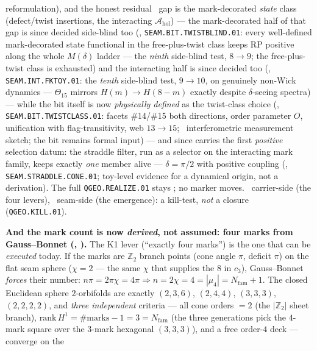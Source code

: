 \documentclass[11pt,a4paper]{article}
\newcommand{\Z}{\mathbb Z}
\begin{document}
\begin{keybox}
reformulation), and the honest residual \mO\ gap is the mark-decorated \emph{state} class
(defect/twist insertions, the interacting $\mathcal A_{\mathrm{hol}}$) --- the mark-decorated
half of that gap is since decided side-blind too
(, \texttt{SEAM.BIT.TWISTBLIND.01}: every well-defined
mark-decorated state functional in the free-plus-twist class keeps RP positive along the whole
$M(\delta)$ ladder --- the \emph{ninth} side-blind test, $8\to9$; the free-plus-twist class is
exhausted) and the interacting half is since decided too
(, \texttt{SEAM.INT.FKTOY.01}: the \emph{tenth}
side-blind test, $9\to10$, on genuinely non-Wick dynamics --- $\Theta_{15}$ mirrors
$H(m)\to H(8-m)$ exactly despite $\delta$-seeing spectra) --- while the bit itself is now
\emph{physically defined} as the twist-class choice
(, \texttt{SEAM.BIT.TWISTCLASS.01}: facets
\#14/\#15 both directions, order parameter $O$, unification with flag-transitivity, web
$13\to15$; \mC\ interferometric measurement sketch; the bit remains formal input) --- and since
carries the first \emph{positive} selection datum: the straddle filter, run as a selector on the
interacting mark family, keeps exactly \emph{one} member alive --- $\delta=\pi/2$ with positive
coupling (, \texttt{SEAM.STRADDLE.CONE.01}; toy-level
evidence for a dynamical origin, not a derivation).
The full \texttt{QGEO.REALIZE.01} stays \mO;
no marker moves. \mE\ carrier-side (the four
levers), \mO\ seam-side (the emergence): a kill-test, \emph{not} a closure (\texttt{QGEO.KILL.01}).
\par\smallskip\noindent\textbf{And the mark count is now \emph{derived}, not assumed: four marks from
Gauss--Bonnet (, ).} The K1 lever
(``exactly four marks'') is the one that can be \emph{executed} today. If the marks are $\Z_2$ branch points
(cone angle $\pi$, deficit $\pi$) on the flat seam sphere ($\chi{=}2$ --- the same $\chi$ that supplies the
$8$ in $c_3$), Gauss--Bonnet \emph{forces} their number: $n\pi=2\pi\chi=4\pi\Rightarrow
n=2\chi=4=|\mu_4|=N_{\mathrm{fam}}{+}1$. The closed Euclidean sphere $2$-orbifolds are exactly
$(2,3,6)$, $(2,4,4)$, $(3,3,3)$, $(2,2,2,2)$, and \emph{three independent} criteria --- all cone orders $=2$ (the
$|\Z_2|$ sheet branch), $\mathrm{rank}\,H^1=\#\text{marks}-1=3=N_{\mathrm{fam}}$ (the three generations pick
the $4$-mark square over the $3$-mark hexagonal $(3,3,3)$), and a free order-$4$ deck --- converge on the

\end{keybox}
\end{document}
